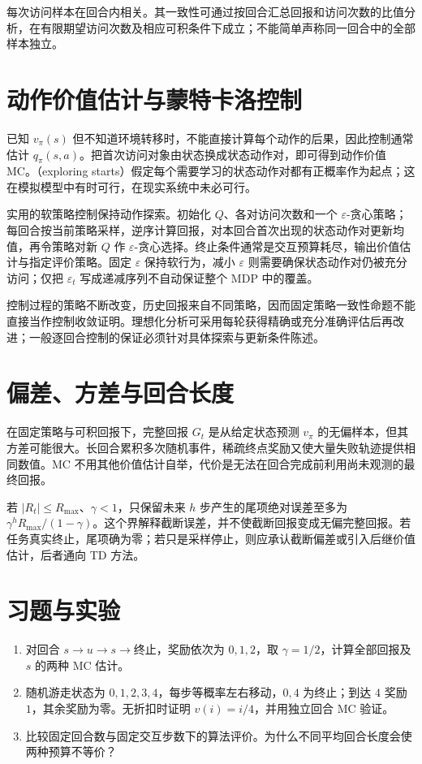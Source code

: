 \documentclass[UTF8,12pt,a4paper,fontset=fandol]{ctexbook}
\begin{document}
每次访问样本在回合内相关。其一致性可通过按回合汇总回报和访问次数的比值分析，在有限期望访问次数及相应可积条件下成立；不能简单声称同一回合中的全部样本独立。

\section{动作价值估计与蒙特卡洛控制}

已知 $v_\pi(s)$ 但不知道环境转移时，不能直接计算每个动作的后果，因此控制通常估计 $q_\pi(s,a)$。把首次访问对象由状态换成状态动作对，即可得到动作价值 MC。（exploring starts）假定每个需要学习的状态动作对都有正概率作为起点；这在模拟模型中有时可行，在现实系统中未必可行。

实用的软策略控制保持动作探索。初始化 $Q$、各对访问次数和一个 $\varepsilon$-贪心策略；每回合按当前策略采样，逆序计算回报，对本回合首次出现的状态动作对更新均值，再令策略对新 $Q$ 作 $\varepsilon$-贪心选择。终止条件通常是交互预算耗尽，输出价值估计与指定评价策略。固定 $\varepsilon$ 保持软行为，减小 $\varepsilon$ 则需要确保状态动作对仍被充分访问；仅把 $\varepsilon_t$ 写成递减序列不自动保证整个 MDP 中的覆盖。

控制过程的策略不断改变，历史回报来自不同策略，因而固定策略一致性命题不能直接当作控制收敛证明。理想化分析可采用每轮获得精确或充分准确评估后再改进；一般逐回合控制的保证必须针对具体探索与更新条件陈述。

\section{偏差、方差与回合长度}

在固定策略与可积回报下，完整回报 $G_t$ 是从给定状态预测 $v_\pi$ 的无偏样本，但其方差可能很大。长回合累积多次随机事件，稀疏终点奖励又使大量失败轨迹提供相同数值。MC 不用其他价值估计自举，代价是无法在回合完成前利用尚未观测的最终回报。

若 $|R_t|\leq R_{\max}$、$\gamma<1$，只保留未来 $h$ 步产生的尾项绝对误差至多为 $\gamma^hR_{\max}/(1-\gamma)$。这个界解释截断误差，并不使截断回报变成无偏完整回报。若任务真实终止，尾项确为零；若只是采样停止，则应承认截断偏差或引入后继价值估计，后者通向 TD 方法。

\section{习题与实验}
\begin{enumerate}
\item 对回合 $s\to u\to s\to\text{终止}$，奖励依次为 $0,1,2$，取 $\gamma=1/2$，计算全部回报及 $s$ 的两种 MC 估计。
\item 随机游走状态为 $0,1,2,3,4$，每步等概率左右移动，$0,4$ 为终止；到达 $4$ 奖励 $1$，其余奖励为零。无折扣时证明 $v(i)=i/4$，并用独立回合 MC 验证。
\item 比较固定回合数与固定交互步数下的算法评价。为什么不同平均回合长度会使两种预算不等价？
\end{enumerate}
\end{document}
